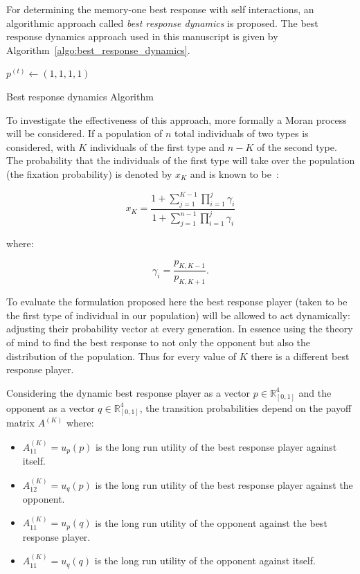 \documentclass[10pt]{article}
\begin{document}
For determining the memory-one best response with self interactions, an
algorithmic approach called \textit{best response dynamics} is proposed. The
best response dynamics approach used in this manuscript is given by
Algorithm~\ref{algo:best_response_dynamics}.

\begin{center}
\begin{minipage}{.55\textwidth}
\begin{algorithm}[H]
       $p^{(t)}\leftarrow (1, 1, 1, 1)$\;
       \caption{Best response dynamics Algorithm}
       \label{algo:best_response_dynamics}
\end{algorithm}
\end{minipage}
\end{center}

To investigate the effectiveness of this approach, more formally a Moran process
will be considered. If a population of \(n\) total individuals of two types is
considered, with \(K\) individuals of the first type and \(n-K\) of the second
type.
The probability that the individuals of the first type will take over the
population (the fixation probability) is denoted by \(x_K\) and is known to
be~\cite{nowak2006evolutionary}:

\[ x_K = \frac{ 1 + \sum_{j=1}^{K-1}\prod_{i=1}^j\gamma_i }{ 1 +
\sum_{j=1}^{n-1}\prod_{i=1}^j\gamma_i } \]

where:

\[ \gamma_i = \frac{ p_{K, K - 1} }{ p_{K, K + 1} }. \]

To evaluate the formulation proposed here the best response player (taken to be
the first type of individual in our population)  will be allowed to act
dynamically: adjusting their probability vector at every generation. In essence
using the theory of mind to find the best response to not only the opponent but
also the distribution of the population. Thus for every value of \(K\) there is
a different best response player.

Considering the dynamic best response player as a vector
\(p\in\mathbb{R}^4_{[0, 1]}\) and the opponent as a vector
\(q\in\mathbb{R}^4_{[0, 1]}\), the transition probabilities depend on
the payoff matrix \(A ^ {(K)}\) where:

\begin{itemize}
    \item \(A ^ {(K)}_{11}=u_{p}(p)\) is the long run utility of the best response player against itself.
    \item \(A ^ {(K)}_{12}=u_{q}(p)\) is the long run utility of the best response player against the opponent.
    \item \(A ^ {(K)}_{11}=u_{p}(q)\) is the long run utility of the opponent against the best response player.
    \item \(A ^ {(K)}_{11}=u_{q}(q)\) is the long run utility of the opponent against itself.
\end{itemize}
\end{document}
